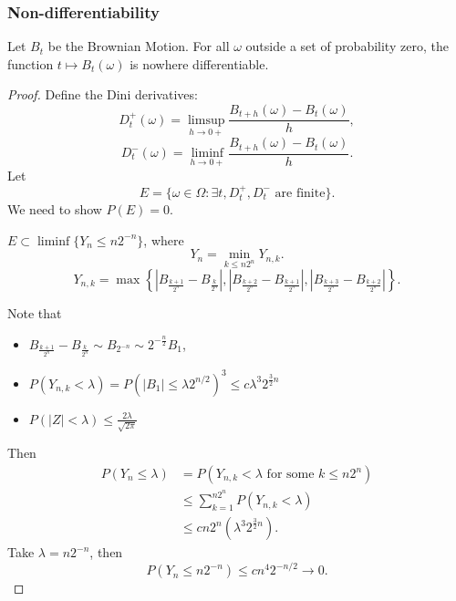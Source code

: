 \subsubsection{Non-differentiability}

\begin{theorem}
	Let $B_t$ be the Brownian Motion. For all $\omega$ outside a set of probability zero, the function $t \mapsto B_t(\omega)$ is nowhere differentiable.
\end{theorem}
\begin{proof}
	Define the Dini derivatives:
	\[
		D_t^+(\omega) = \limsup_{h \to 0+} \frac{B_{t + h}(\omega) - B_t(\omega)}{h}
	,\]
	\[
		D_t^-(\omega) = \liminf_{h \to 0+} \frac{B_{t + h}(\omega) - B_t(\omega)}{h}
	.\] 
	Let 
	 \[
		E = 
		\{\omega \in \Omega: \exists t,  D_t^+, D_t^- \text{ are finite}  \} 
	.\] 
	We need to show $P(E) = 0$.

	\begin{claim}
		$E \subset \liminf \{Y_n \le  n 2^{-n}\} $, where
		\[
			Y_n = \min_{k \le n 2^n} Y_{n, k}
		.\] 
		\[
			Y_{n, k} = \max \left\{\left| B_{\frac{k+1}{2^n}}- B_{\frac{k}{2^n}} \right|,  \left| B_{\frac{k+2}{2^n}}- B_{\frac{k+1}{2^n}} \right|, \left| B_{\frac{k+3}{2^n}}- B_{\frac{k+2}{2^n}} \right| \right\} 
		.\] 
	\end{claim}
	Note that
	\begin{itemize}
		\item $B_{\frac{k+1}{2^n}}- B_{\frac{k}{2^n}} \sim B_{2^{-n}}\sim 2^{-\frac{n}{2}}B_1$,
		\item $P\left( Y_{n, k} < \lambda \right) = P\left( |B_1| \le \lambda 2^{n / 2} \right) ^3 \le  c \lambda ^3 2^{\frac{3}{2} n}$
		\item $P\left( |Z| < \lambda \right) \le \frac{2 \lambda}{\sqrt{2 \pi} }$
	\end{itemize}
	Then
	\begin{align*}
		P\left( Y_n \le \lambda \right) 
		&= P\left( Y_{n, k}< \lambda \text{ for some } k \le n 2^n\right)  \\
		&\leq \sum_{k=1}^{n 2^n} P\left( Y_{n, k} < \lambda \right)  \\
		&\leq c n 2^n \left( \lambda^3 2^{\frac{3}{2} n} \right)  
	.\end{align*}
	Take $\lambda = n 2^{-n}$, then
	\[
		P\left( Y_{n} \le  n 2 ^{-n} \right) 
		\le c n^4 2^{- n / 2} \to  0
	.\] 
	

\end{proof}
